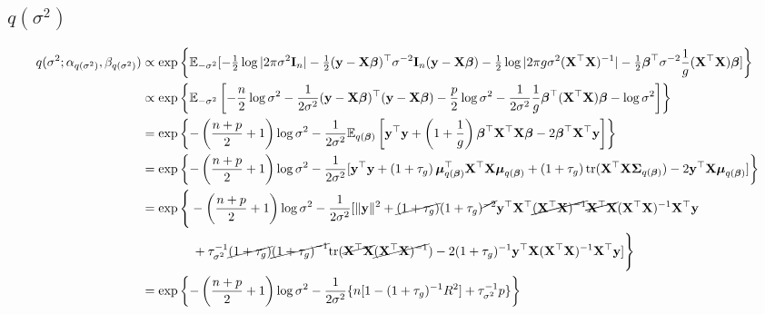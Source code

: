 \documentclass{amsart}[12pt]
\begin{document}
\subsection{$q(\sigma^2)$}
\begin{align*}
	q(\sigma^2; \alpha_{q(\sigma^2)}, \beta_{q(\sigma^2)}) & \propto \exp \left \{ \mathbb{E}_{-\sigma^2} [-\tfrac{1}{2} \log |2 \pi \sigma^2 {\bf I}_n| - \tfrac{1}{2} ({\bf y} - {\bf X} {\boldsymbol \beta})^\top \sigma^{-2} {\bf I}_n ({\bf y} - {\bf X} {\boldsymbol \beta}) - \tfrac{1}{2} \log |2 \pi g \sigma^2 ({\bf X}^\top {\bf X})^{-1}| - \tfrac{1}{2} {\boldsymbol \beta}^\top \sigma^{-2} \frac{1}{g} ({\bf X}^\top {\bf X}) {\boldsymbol \beta}] \right \}                        \\
	                                                       & \propto  \exp \left \{ \mathbb{E}_{-\sigma^2} \left[- \frac{n}{2} \log \sigma^2 - \frac{1}{2 \sigma^2}({\bf y} - {\bf X} {\boldsymbol \beta})^\top({\bf y} - {\bf X} {\boldsymbol \beta}) - \frac{p}{2} \log \sigma^2 - \frac{1}{2 \sigma^2} \frac{1}{g} {\boldsymbol \beta}^\top ({\bf X}^\top {\bf X}) {\boldsymbol \beta} - \log \sigma^2\right] \right \}                             \\
	                                                       & =  \exp \left \{ {-\left(\frac{n + p}{2} + 1\right) \log \sigma^2 - \frac{1}{2 \sigma^2} \mathbb{E}_{q({\boldsymbol \beta})} \left[ {\bf y}^\top {\bf y} + \left(1 + \frac{1}{g} \right) {\boldsymbol \beta}^\top {\bf X}^\top {\bf X} {\boldsymbol\beta} - 2 {\boldsymbol \beta}^\top {\bf X}^\top {\bf y} \right]}  \right \}                                                          \\
	                                                       & =  \exp \left \{ -\left(\frac{n + p}{2} + 1 \right)\log \sigma^2  - \frac{1}{2 \sigma^2} [{\bf y}^\top{\bf y} + \left( 1 + \tau_g \right) {\boldsymbol \mu}_{q({\boldsymbol \beta})}^\top {\bf X}^\top {\bf X} {\boldsymbol\mu}_{q({\boldsymbol \beta})} + \left( 1 + \tau_g \right) \text{tr}({\bf X}^\top {\bf X} {\boldsymbol\Sigma}_{q({\boldsymbol \beta})}) - 2 {\bf y}^\top {\bf X} {\boldsymbol\mu}_{q({\boldsymbol \beta})} ] \right \} \\
	                                                       & =  \exp \Bigg \{ -\left(\frac{n + p}{2} + 1 \right)\log \sigma^2  - \frac{1}{2 \sigma^2} [\|{\bf y}\|^2 + \cancel{\left( 1 + \tau_g \right)} (1 + \tau_g)^{\cancel{-2}} {\bf y}^\top {\bf X}^\top \cancel{({\bf X}^\top {\bf X})^{-1}} \cancel{{\bf X}^\top {\bf X}} ({\bf X}^\top {\bf X})^{-1} {\bf X}^\top {\bf y}                             \\
	                                                       & \quad \quad \quad \quad + \tau_{\sigma^2}^{-1} \cancel{\left( 1 + \tau_g \right)} \cancel{\left( 1 + \tau_g \right)^{-1}} \text{tr}(\cancel{{\bf X}^\top {\bf X}} \cancel{({\bf X}^\top {\bf X})^{-1}}) - 2 (1 + \tau_g)^{-1} {\bf y}^\top {\bf X} ({\bf X}^\top {\bf X})^{-1} {\bf X}^\top {\bf y} ] \Bigg \}                                      \\
	                                                       & = \exp \left \{ -\left(\frac{n + p}{2} + 1 \right)\log \sigma^2 - \frac{1}{2 \sigma^2} \{n[1 - (1 + \tau_g)^{-1}  R^2] + \tau_{\sigma^2}^{-1} p \} \right \}                                                                                                                                          
\end{align*}
\end{document}
